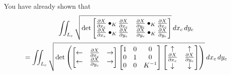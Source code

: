 \documentclass[newpage,hints,handout]{ximera}
\begin{document}
You have already shown that
\begin{multline*}
  \iint_{L_c} \sqrt{
    \det
    \begin{bmatrix}
      \pp[X]{x_c}\bullet_K \pp[X]{x_c} & \pp[X]{y_c}\bullet_K \pp[X]{x_c} \\
      \pp[X]{x_c}\bullet_K \pp[X]{y_c} & \pp[X]{y_c}\bullet_K \pp[X]{y_c}
    \end{bmatrix}
  }\d x_c\d y_c \\
  =\iint_{L_c} \sqrt{
    \det\left(
      \begin{bmatrix}
        \leftarrow & \pp[X]{x_c} & \rightarrow \\
        \leftarrow & \pp[X]{y_c} & \rightarrow
      \end{bmatrix}
      \begin{bmatrix}
        1 & 0 & 0\\
        0 & 1 & 0\\
        0 & 0 & K^{-1}
      \end{bmatrix}
      \begin{bmatrix}
        \uparrow & \uparrow \\
        \pp[X]{x_c} & \pp[X]{y_c} \\
        \downarrow & \downarrow
      \end{bmatrix}\right)
  }\d x_c\d y_c
\end{multline*}
\end{document}
